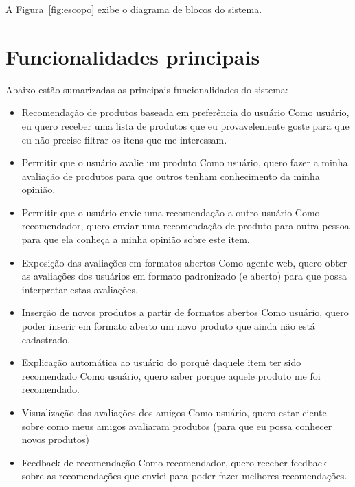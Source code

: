 A Figura~\ref{fig:escopo} exibe o diagrama de blocos do sistema.


\section{Funcionalidades principais} %
\label{sec:funcionalidades_principais}

Abaixo estão sumarizadas as principais funcionalidades do sistema:

\begin{itemize}

	\item Recomendação de produtos baseada em preferência do usuário
	\subitem Como usuário, eu quero receber uma lista de produtos que eu provavelemente goste para que eu não precise filtrar os itens que me interessam.

	\item Permitir que o usuário avalie um produto
  \subitem Como usuário, quero fazer a minha avaliação de produtos para que outros tenham conhecimento da minha opinião.

	\item Permitir que o usuário envie uma recomendação a outro usuário
  \subitem Como recomendador, quero enviar uma recomendação de produto para outra pessoa para que ela conheça a minha opinião sobre este item.

	\item Exposição das avaliações em formatos abertos
  \subitem Como agente web, quero obter as avaliações dos usuários em formato padronizado (e aberto) para que possa interpretar estas avaliações.

    \item Inserção de novos produtos a partir de formatos abertos
    \subitem Como usuário, quero poder inserir em formato aberto um novo produto que ainda não está cadastrado.

    \item Explicação automática ao usuário do porquê daquele item ter sido recomendado
    \subitem Como usuário, quero saber porque aquele produto me foi recomendado.

    \item Visualização das avaliações dos amigos
    \subitem Como usuário, quero estar ciente sobre como meus amigos avaliaram produtos (para que eu possa conhecer novos produtos)

    \item Feedback de recomendação
    \subitem Como recomendador, quero receber feedback sobre as recomendações que enviei para poder fazer melhores recomendações.

	
\end{itemize}

